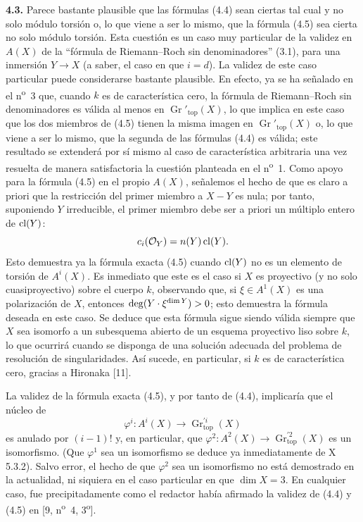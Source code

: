 \textbf{4.3.} Parece bastante plausible que las fórmulas (4.4) sean ciertas
tal cual y no solo módulo torsión o, lo que viene a ser lo mismo, que la
fórmula (4.5) sea cierta no solo módulo torsión. Esta cuestión es un caso muy
particular de la validez en $A(X)$ de la ``fórmula de Riemann--Roch sin
denominadores'' (3.1), para una inmersión $Y\to X$ (a saber, el caso en que
$i=d$). La validez de este caso particular puede considerarse bastante
plausible. En efecto, ya se ha señalado en el n\textsuperscript{o}~3 que,
cuando $k$ es de característica cero, la fórmula de Riemann--Roch sin
denominadores es válida al menos en $\operatorname{Gr}'_{\mathrm{top}}(X)$,
lo que implica en este caso que los dos miembros de (4.5) tienen la misma
imagen en $\operatorname{Gr}'_{\mathrm{top}}(X)$ o, lo que viene a ser lo
mismo, que la segunda de las fórmulas (4.4) es válida; este resultado se
extenderá por sí mismo al caso de característica arbitraria una vez resuelta
de manera satisfactoria la cuestión planteada en el n\textsuperscript{o}~1.
Como apoyo para la fórmula (4.5) en el propio $A(X)$, señalemos el hecho de que
es claro a priori que la restricción del primer miembro a $X-Y$ es nula; por
tanto, suponiendo $Y$ irreducible, el primer miembro debe ser a priori un
múltiplo entero de $\cl(Y)$:
\[
 c_i(\sisi{Y}{\mathcal O_Y})=n(Y)\cl(Y). %
\]
Esto demuestra ya la fórmula exacta (4.5) cuando $\cl(Y)$ no es un elemento
de torsión de $A^i(X)$. Es inmediato que este es el caso si $X$ es proyectivo
(y no solo cuasiproyectivo) sobre el cuerpo $k$, observando que, si
$\xi\in A^1(X)$ es una polarización de $X$, entonces
$\deg(Y\cdot\xi^{\sisi{i}{\dim Y}})>0$; esto demuestra la fórmula deseada en este caso. Se %
deduce que esta fórmula sigue siendo válida siempre que $X$ sea isomorfo a un
subesquema abierto de un esquema proyectivo liso sobre $k$, lo que ocurrirá
cuando se disponga de una solución adecuada del problema de resolución de
singularidades. Así sucede, en particular, si $k$ es de característica cero,
gracias a Hironaka [11].

La validez de la fórmula exacta (4.5), y por tanto de (4.4), implicaría que el
núcleo de
\[
 \varphi^i:A^i(X)\longrightarrow \operatorname{Gr}_{\mathrm{top}}^{\prime i}(X)
\]
es anulado por $(i-1)!$ y, en particular, que
$\varphi^2:A^2(X)\to\operatorname{Gr}_{\mathrm{top}}^{\prime 2}(X)$ es un
isomorfismo. (Que $\varphi^1$ sea un isomorfismo se deduce ya inmediatamente
de X 5.3.2). Salvo error, el hecho de que $\varphi^2$ sea un isomorfismo no
está demostrado en la actualidad, ni siquiera en el caso particular en que
$\dim X=3$. En cualquier caso, fue precipitadamente como el redactor había
afirmado la validez de (4.4) y (4.5) en [9,
n\textsuperscript{o}~4, 3\textsuperscript{o}].

